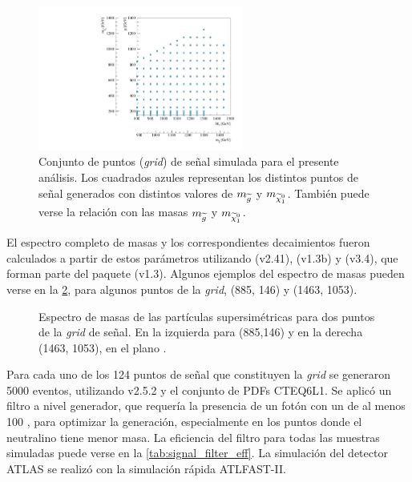 \begin{figure}[!htb]
  \centering
  \includegraphics[width=0.6\textwidth]{figures/run1_grid}
  \caption{Conjunto de puntos (\emph{grid}) de señal simulada para el presente
    análisis. Los cuadrados azules representan los distintos puntos de señal
    generados con distintos valores de $m_{\widetilde{g}}$ y $m_{\ninoone}$. También
    puede verse la relación con las masas $m_{\widetilde{g}}$ y $m_{\ninoone}$.}
  \label{fig:gridpoints}
\end{figure}


El espectro completo de masas y los correspondientes decaimientos fueron
calculados a partir de estos parámetros utilizando {\suspect}
(v2.41)\cite{Djouadi2007426}, {\sdecay} (v1.3b)\cite{Muhlleitner:2004mka} y
{\hdecay} (v3.4)\cite{Djouadi:1997yw}, que forman parte del paquete {\susyhit}
(v1.3)\cite{Djouadi:2006bz}. Algunos ejemplos del espectro de masas pueden verse
en la \cref{fig:mass_spectra}, para algunos puntos de la \emph{grid}, (885, 146) y (1463, 1053).

\begin{figure}[!htb]
  \centering

  \resizebox{0.49\textwidth}{!}{}
  \resizebox{0.49\textwidth}{!}{}


   \caption{Espectro de masas de las partículas supersimétricas para dos puntos de la \emph{grid} de señal.
     En la izquierda para (885,146) y en la derecha (1463, 1053), en el plano \mgmn.}
   \label{fig:mass_spectra}
\end{figure}

Para cada uno de los 124 puntos de señal que constituyen la \emph{grid} se generaron
5000 eventos, utilizando {\herwigpp} v2.5.2\cite{Bahr:2008pv} y el conjunto de
PDFs CTEQ6L1\cite{Nadolsky:2008zw}. Se aplicó un filtro a nivel generador, que
requería la presencia de un fotón con un {\pt} de al menos 100 \gev, para
optimizar la generación, especialmente en los puntos donde el
neutralino tiene menor masa. La eficiencia del filtro para todas las muestras
simuladas puede verse en la \cref{tab:signal_filter_eff}. La simulación del
detector ATLAS se realizó con la simulación rápida
\textsc{ATLFAST-II}\cite{Richter-Was:683751}.


